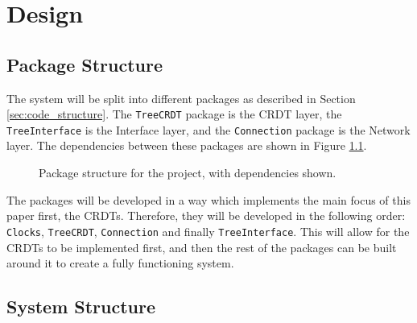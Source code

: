 \documentclass[12pt]{report}
\begin{document}
\newpage
\chapter{Design}

\section{Package Structure}
The system will be split into different packages as described in Section \ref{sec:code_structure}. The \texttt{TreeCRDT} package is the CRDT layer, the \texttt{TreeInterface} is the Interface layer, and the \texttt{Connection} package is the Network layer. The dependencies between these packages are shown in Figure \ref{fig:packages}.

\begin{figure}[H] 
    \centering
    \caption{Package structure for the project, with dependencies shown.}
    \label{fig:packages}
\end{figure}

The packages will be developed in a way which implements the main focus of this paper first, the CRDTs. Therefore, they will be developed in the following order: \texttt{Clocks}, \texttt{TreeCRDT}, \texttt{Connection} and finally \texttt{TreeInterface}. This will allow for the CRDTs to be implemented first, and then the rest of the packages can be built around it to create a fully functioning system. \par

\section{System Structure}
\end{document}
